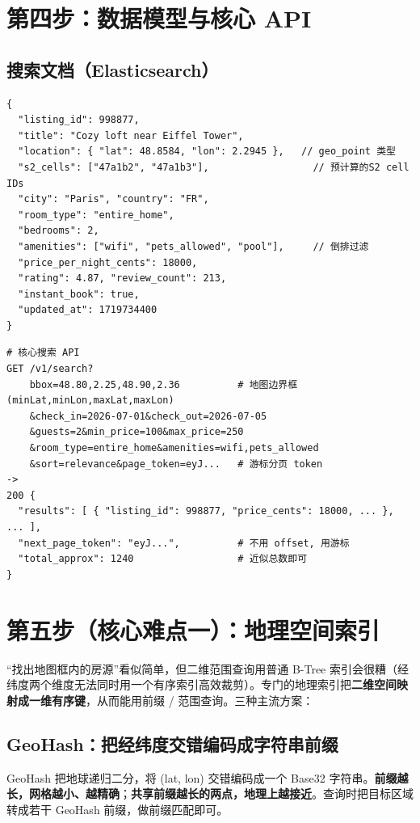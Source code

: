 \section{第四步：数据模型与核心 API}

\subsection{搜索文档（Elasticsearch）}

\begin{lstlisting}
{
  "listing_id": 998877,
  "title": "Cozy loft near Eiffel Tower",
  "location": { "lat": 48.8584, "lon": 2.2945 },   // geo_point 类型
  "s2_cells": ["47a1b2", "47a1b3"],                  // 预计算的S2 cell IDs
  "city": "Paris", "country": "FR",
  "room_type": "entire_home",
  "bedrooms": 2,
  "amenities": ["wifi", "pets_allowed", "pool"],     // 倒排过滤
  "price_per_night_cents": 18000,
  "rating": 4.87, "review_count": 213,
  "instant_book": true,
  "updated_at": 1719734400
}
\end{lstlisting}

\begin{lstlisting}
# 核心搜索 API
GET /v1/search?
    bbox=48.80,2.25,48.90,2.36          # 地图边界框 (minLat,minLon,maxLat,maxLon)
    &check_in=2026-07-01&check_out=2026-07-05
    &guests=2&min_price=100&max_price=250
    &room_type=entire_home&amenities=wifi,pets_allowed
    &sort=relevance&page_token=eyJ...   # 游标分页 token
->
200 {
  "results": [ { "listing_id": 998877, "price_cents": 18000, ... }, ... ],
  "next_page_token": "eyJ...",          # 不用 offset, 用游标
  "total_approx": 1240                  # 近似总数即可
}
\end{lstlisting}

\section{第五步（核心难点一）：地理空间索引}

“找出地图框内的房源”看似简单，但二维范围查询用普通 B-Tree 索引会很糟（经纬度两个维度无法同时用一个有序索引高效裁剪）。专门的地理索引把\textbf{二维空间映射成一维有序键}，从而能用前缀 / 范围查询。三种主流方案：

\subsection{GeoHash：把经纬度交错编码成字符串前缀}

GeoHash 把地球递归二分，将 (lat, lon) 交错编码成一个 Base32 字符串。\textbf{前缀越长，网格越小、越精确}；\textbf{共享前缀越长的两点，地理上越接近}。查询时把目标区域转成若干 GeoHash 前缀，做前缀匹配即可。

